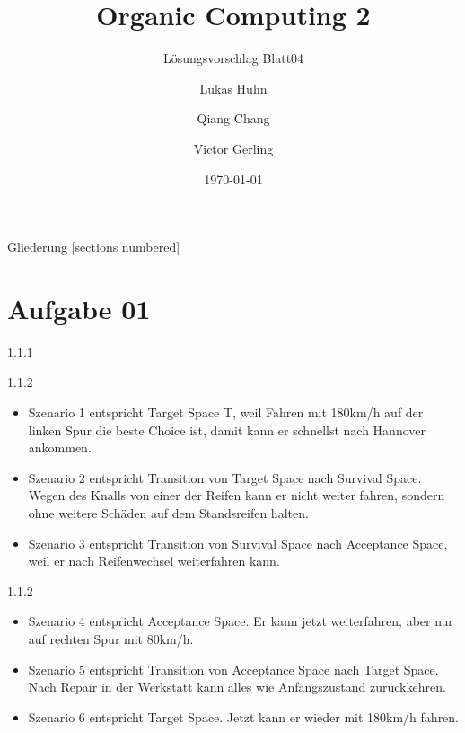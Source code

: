 \documentclass{ocbeameruni}
\title{Organic Computing 2}
\subtitle{Lösungsvorschlag Blatt04}
\date{\today}
\author{Lukas Huhn \and Qiang Chang \and Victor Gerling}
\institute{%
  Universität Augsburg\\
  Institut für Informatik\\
  Lehrstuhl für Organic Computing
}
\begin{document}
\maketitle


\begin{frame}{Gliederung}
  [sections numbered]
  \tableofcontents
\end{frame}


\section{Aufgabe 01}

\begin{frame}{1.1.1}
\end{frame}

\begin{frame}{1.1.2}
    \begin{itemize} 
    \item Szenario 1 entspricht Target Space T, weil Fahren mit 180km/h auf der linken Spur die beste Choice ist, damit kann er schnellst nach Hannover ankommen.
    \item Szenario 2 entspricht Transition von Target Space nach Survival Space. Wegen des Knalls von einer der Reifen kann er nicht weiter fahren, sondern ohne 
weitere Schäden auf dem Standsreifen halten.
    \item Szenario 3 entspricht Transition von Survival Space nach Acceptance Space, weil er nach Reifenwechsel weiterfahren kann.
    \end{itemize}
\end{frame}

\begin{frame}{1.1.2}
    \begin{itemize} 
    \item Szenario 4 entspricht Acceptance Space. Er kann jetzt weiterfahren, aber nur auf rechten Spur mit 80km/h.
    \item Szenario 5 entspricht Transition von Acceptance Space nach Target Space. Nach Repair in der Werkstatt kann alles wie Anfangszustand zurückkehren. 
    \item Szenario 6 entspricht Target Space. Jetzt kann er wieder mit 180km/h fahren.
    \end{itemize}
\end{frame}
\end{document}
